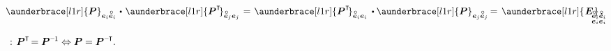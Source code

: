 \nopagebreak\vspace{-0.8em}\begin{equation}\label{orthogonalityofrotationtensor}
\aunderbrace[l1r]{\bm{P}}_{\bm{e}_i \mathcircabove{\bm{e}}_i} \hspace{.1em} \dotp \hspace{.1em} \aunderbrace[l1r]{\bm{P}^{\T}\hspace{-0.2em}}_{\mathcircabove{\bm{e}}_j \bm{e}_j}
\hspace{.2ex} = \hspace{.2ex}
\aunderbrace[l1r]{\bm{P}^{\T}\hspace{-0.2em}}_{\mathcircabove{\bm{e}}_i \bm{e}_i} \hspace{.2em} \dotp \aunderbrace[l1r]{\bm{P}}_{\bm{e}_j \mathcircabove{\bm{e}}_j}
\hspace{-0.2ex} = \hspace{.3ex}
\aunderbrace[l1r]{\hspace{.2ex}\bm{E}\hspace{.2ex}}_{\mathclap{\begin{subarray}{l} \mathcircabove{\bm{e}}_i \mathcircabove{\bm{e}}_i \\ \bm{e}_i \bm{e}_i \end{subarray}}}
\hspace{.1em} ,
\end{equation}

\vspace{-0.1em} \noindent {}   ~: ${\bm{P}^{\T} \hspace{-0.32ex}= \bm{P}^{\expminusone} \Leftrightarrow \bm{P} = \bm{P}^{\expminusT}\hspace{-0.25ex}}$.

